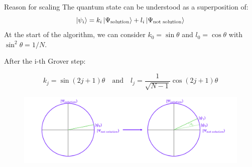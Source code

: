 \documentclass[11p,aspectratio=169]{beamer}
\begin{document}
\begin{frame}{Reason for scaling}
    The quantum state can be understood as a superposition of:
    $$ \ket{\psi_i} = k_i \ket{\Psi_{\text{solution}}} + l_i \ket{\Psi_{\text{not solution}}} $$
    At the start of the algorithm, we can consider $k_0 = \sin \theta$ and $l_0 = \cos \theta $ with $\sin^2 \theta = 1 / N$.

    After the i-th Grover step:
    
    \begin{equation*}
        k_j = \sin (2 j + 1) \theta \quad \text{and} \quad l_j = \frac{1}{\sqrt{N-1}} \cos (2 j + 1) \theta
    \end{equation*}

    \begin{figure}
        \includegraphics[width= \textwidth]{figures/grover1.png}
    \end{figure}
\end{frame}
\end{document}

